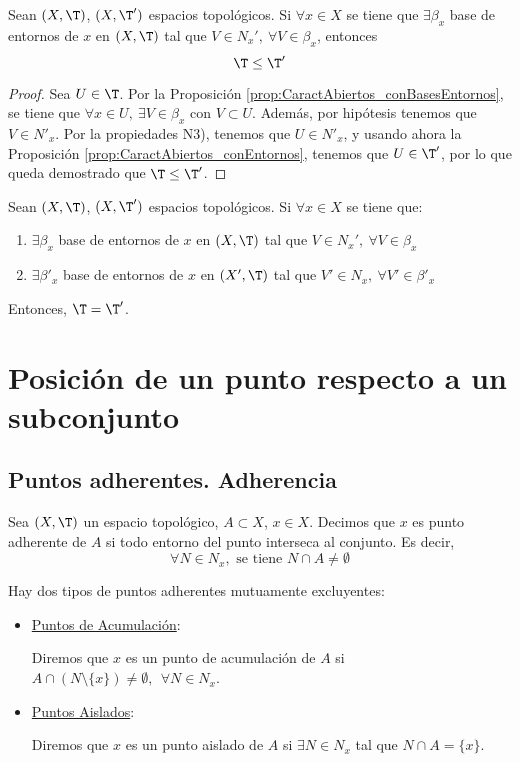 \begin{prop}
    Sean $(X,\T)$, $(X,\T')$ espacios topológicos. Si $\forall x\in X$ se tiene que $\exists \beta_x$ base de entornos de $x$ en $(X,\T)$ tal que $V\in N_x',~\forall V\in \beta_x$, entonces $$\T\leq \T'$$
\end{prop}
\begin{proof}
    Sea $U\in \T$. Por la Proposición \ref{prop:CaractAbiertos_conBasesEntornos}, se tiene que $\forall x\in U,~\exists V\in \beta_x$ con $V\subset U$. Además, por hipótesis tenemos que $V\in N'_x$. Por la propiedades N3), tenemos que $U\in N'_x$, y usando ahora la Proposición \ref{prop:CaractAbiertos_conEntornos}, tenemos que $U\in \T'$, por lo que queda demostrado que $\T\leq \T'$.
\end{proof}
\begin{coro}\label{coro:TopIg_BasesEntornos}
    Sean $(X,\T)$, $(X,\T')$ espacios topológicos. Si $\forall x\in X$ se tiene que:
    \begin{enumerate}
        \item $\exists \beta_x$ base de entornos de $x$ en $(X,\T)$ tal que $V\in N_x',~\forall V\in \beta_x$
        \item $\exists \beta'_x$ base de entornos de $x$ en $(X',\T)$ tal que $V'\in N_x,~\forall V'\in \beta'_x$
    \end{enumerate}
    Entonces, $\T = \T'$.
\end{coro}


\section{Posición de un punto respecto a un subconjunto}
\subsection{Puntos adherentes. Adherencia}
\begin{definicion}
    Sea $(X,\T)$ un espacio topológico, $A\subset X$, $x\in X$. Decimos que $x$ es punto adherente de $A$ si todo entorno del punto interseca al conjunto. Es decir,
    \begin{equation*}
        \forall N\in N_x,\text{ se tiene } N\cap A\neq \emptyset
    \end{equation*}

    Hay dos tipos de puntos adherentes mutuamente excluyentes:
    \begin{itemize}
        \item \ul{Puntos de Acumulación}:

        Diremos que $x$ es un punto de acumulación de $A$ si $A\cap (N\setminus \{x\})\neq \emptyset, ~~\forall N\in N_x$.

        \item \ul{Puntos Aislados}:

        Diremos que $x$ es un punto aislado de $A$ si $\exists N\in N_x$ tal que $N\cap A=\{x\}$.
    \end{itemize}
\end{definicion}



